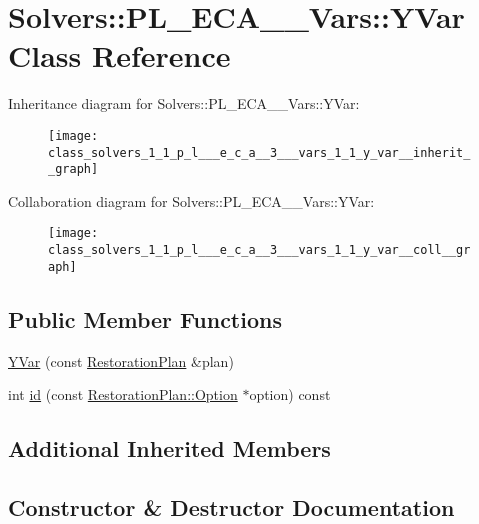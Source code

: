 \hypertarget{class_solvers_1_1_p_l___e_c_a__3___vars_1_1_y_var}{}\section{Solvers\+:\+:P\+L\+\_\+\+E\+C\+A\+\_\+\_\+\+Vars\+:\+:Y\+Var Class Reference}
\label{class_solvers_1_1_p_l___e_c_a__3___vars_1_1_y_var}


Inheritance diagram for Solvers\+:\+:P\+L\+\_\+\+E\+C\+A\+\_\+\_\+\+Vars\+:\+:Y\+Var\+:\nopagebreak
\begin{figure}[H]
\begin{center}
\leavevmode
\texttt{[image: class\_solvers\_1\_1\_p\_l\_\_\_e\_c\_a\_\_3\_\_\_vars\_1\_1\_y\_var\_\_inherit\_\_graph]}
\end{center}
\end{figure}


Collaboration diagram for Solvers\+:\+:P\+L\+\_\+\+E\+C\+A\+\_\+\_\+\+Vars\+:\+:Y\+Var\+:\nopagebreak
\begin{figure}[H]
\begin{center}
\leavevmode
\texttt{[image: class\_solvers\_1\_1\_p\_l\_\_\_e\_c\_a\_\_3\_\_\_vars\_1\_1\_y\_var\_\_coll\_\_graph]}
\end{center}
\end{figure}
\subsection*{Public Member Functions}
\begin{DoxyCompactItemize}
\item 
\hyperlink{class_solvers_1_1_p_l___e_c_a__3___vars_1_1_y_var_ab8aac441ec1a1d2a4ab727c5b0e14978}{Y\+Var} (const \hyperlink{class_restoration_plan}{Restoration\+Plan} \&plan)
\item 
int \hyperlink{class_solvers_1_1_p_l___e_c_a__3___vars_1_1_y_var_a6a16fe1b85ab58f65f957daf5dd22788}{id} (const \hyperlink{class_restoration_plan_1_1_option}{Restoration\+Plan\+::\+Option} $\ast$option) const
\end{DoxyCompactItemize}
\subsection*{Additional Inherited Members}


\subsection{Constructor \& Destructor Documentation}
\mbox{\label{class_solvers_1_1_p_l___e_c_a__3___vars_1_1_y_var_ab8aac441ec1a1d2a4ab727c5b0e14978}} 
